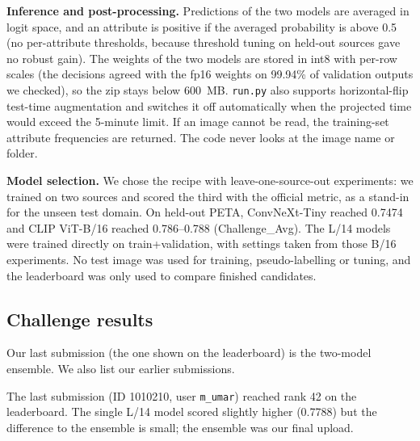 \documentclass[a4paper, 10pt, conference]{ieeeconf}
\begin{document}
\textbf{Inference and post-processing.} Predictions of the two models are averaged in logit space, and an attribute is positive if the averaged probability is above 0.5 (no per-attribute thresholds, because threshold tuning on held-out sources gave no robust gain). The weights of the two models are stored in int8 with per-row scales (the decisions agreed with the fp16 weights on 99.94\% of validation outputs we checked), so the zip stays below 600~MB. \texttt{run.py} also supports horizontal-flip test-time augmentation and switches it off automatically when the projected time would exceed the 5-minute limit. If an image cannot be read, the training-set attribute frequencies are returned. The code never looks at the image name or folder.

\textbf{Model selection.} We chose the recipe with leave-one-source-out experiments: we trained on two sources and scored the third with the official metric, as a stand-in for the unseen test domain. On held-out PETA, ConvNeXt-Tiny reached 0.7474 and CLIP ViT-B/16 reached 0.786--0.788 (Challenge\_Avg). The L/14 models were trained directly on train+validation, with settings taken from those B/16 experiments. No test image was used for training, pseudo-labelling or tuning, and the leaderboard was only used to compare finished candidates.


\subsection{Challenge results}
Our last submission (the one shown on the leaderboard) is the two-model ensemble. We also list our earlier submissions.
\begin{table}[h]
\centering
\caption{Codabench results on the hidden test set (Track 1).}
\label{tab:results}
{}
\end{table}
The last submission (ID 1010210, user \texttt{m\_umar}) reached rank 42 on the leaderboard. The single L/14 model scored slightly higher (0.7788) but the difference to the ensemble is small; the ensemble was our final upload.
\end{document}
